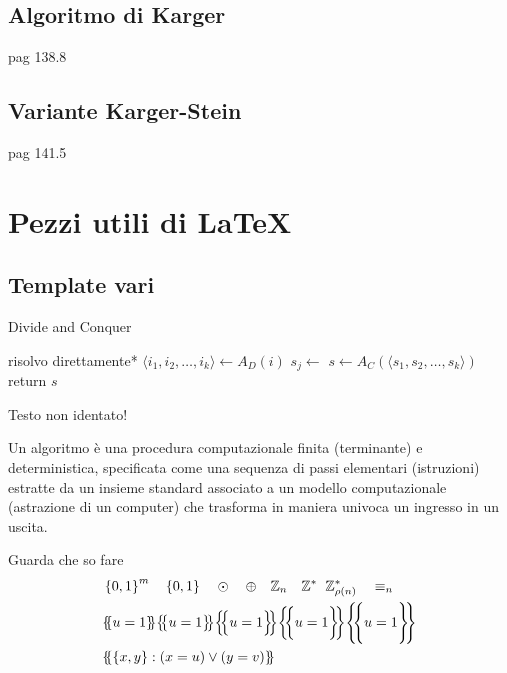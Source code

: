 \subsection{Algoritmo di Karger}
pag 138.8

\subsection{Variante Karger-Stein}
pag 141.5

\section{Pezzi utili di \LaTeX{}}

\subsection{Template vari}

\begin{algorithm}[H]
\caption{Divide and Conquer}\label{alg:dnc}
\begin{algorithmic}[1]
            \State *risolvo direttamente*
        \EndIf
        \State $\langle i_1, i_2, \dots, i_k \rangle \gets A_D(i)$ 
            \State $s_j \gets $
        \EndFor
        \State $s \gets A_C(\langle s_1, s_2, \dots, s_k \rangle)$
        \State return $s$
    \EndProcedure
\end{algorithmic}
\end{algorithm}
\noindent
Testo non identato!

\begin{definition}[Algoritmo]\label{def:algex}
    Un algoritmo è una procedura computazionale finita (terminante) e deterministica, specificata come una sequenza di passi elementari (istruzioni) estratte da un insieme standard associato a un modello computazionale (astrazione di un computer) che trasforma in maniera univoca un ingresso in un uscita.
\end{definition}

Guarda che so fare
\begin{align*}
    &
    \setzo{m}
    \quad
    \setzo{}
    \quad
    \odot
    \quad
    \oplus
    \quad
    \zz{n}
    \quad
    \zs
    \quad
    \zs{\rho(n)}
    \quad
    \equiv_n
    \\
    &
    \ldblbrace
        u = 1
    \rdblbrace
    \ldblbraceb
        u = 1
    \rdblbraceb
    \ldblbraceB
        u = 1
    \rdblbraceB
    \ldblbracebb
        u = 1
    \rdblbracebb
    \ldblbraceBB
        u = 1
    \rdblbraceBB
    \\
    &
    \ldblbrace
        \left\{ x, y \right\}
        :
        \left( x = u \right)
        \vee
        \left( y = v \right)
    \rdblbrace
\end{align*}

